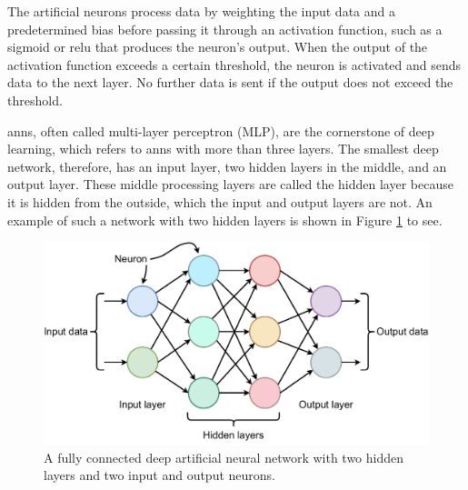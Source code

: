     The artificial neurons process data by weighting the input data and a predetermined bias before passing it through an activation function, such as a sigmoid or \gls{relu} \cite{dubeyActivationFunctionsDeep2022} that produces the neuron's output. When the output of the activation function exceeds a certain threshold, the neuron is activated and sends data to the next layer. No further data is sent if the output does not exceed the threshold.

    
   \glspl{ann}, often called multi-layer perceptron (MLP), are the cornerstone of deep learning, which refers to \glspl{ann} with more than three layers. The smallest deep network, therefore, has an input layer, two hidden layers in the middle, and an output layer. These middle processing layers are called the hidden layer because it is hidden from the outside, which the input and output layers are not. An example of such a network with two hidden layers is shown in Figure \ref{fig:deep_network} to see. 


    \begin{figure}[htb]
        \centering
        \includegraphics[width=\linewidth]{images/deep_neural_network}
        \caption[Figure of a fully connected deep artificial.]{A fully connected deep artificial neural network with two hidden layers and two input and output neurons.} %
        \label{fig:deep_network}
    \end{figure}

